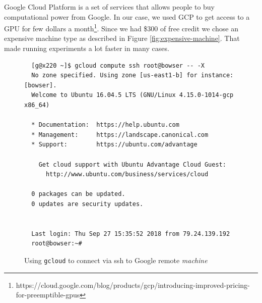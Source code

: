 Google Cloud Platform is a set of services that allows people to buy
computational power from Google. In our case, we used GCP to get access
to a GPU for few dollars a
month\footnote{https://cloud.google.com/blog/products/gcp/introducing-improved-pricing-for-preemptible-gpus}.
Since we had \$300 of free credit we chose an expensive machine type as
described in Figure \ref{fig:expensive-machine}. That made running
experiments a lot faster in many cases.

\begin{figure}
  \begin{verbatim}
  [g@x220 ~]$ gcloud compute ssh root@bowser -- -X
  No zone specified. Using zone [us-east1-b] for instance: [bowser].
  Welcome to Ubuntu 16.04.5 LTS (GNU/Linux 4.15.0-1014-gcp x86_64)

  * Documentation:  https://help.ubuntu.com
  * Management:     https://landscape.canonical.com
  * Support:        https://ubuntu.com/advantage

    Get cloud support with Ubuntu Advantage Cloud Guest:
      http://www.ubuntu.com/business/services/cloud

  0 packages can be updated.
  0 updates are security updates.


  Last login: Thu Sep 27 15:35:52 2018 from 79.24.139.192
  root@bowser:~# 
  \end{verbatim}
  \caption{Using \texttt{gcloud} to connect via ssh to Google remote \emph{machine}}
\end{figure}
